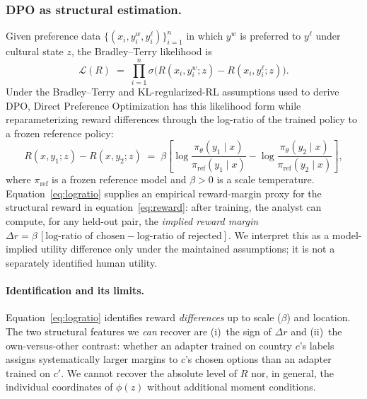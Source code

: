 \documentclass[11pt,letterpaper]{article}
\begin{document}
\subsubsection{DPO as structural estimation.}
Given preference data $\{(x_i,y_i^{w},y_i^{\ell})\}_{i=1}^{n}$ in which $y^{w}$ is preferred to $y^{\ell}$ under cultural state $z$, the Bradley--Terry likelihood is
\begin{equation}
  \mathcal{L}(R) \;=\; \prod_{i=1}^{n} \sigma\bigl(R(x_i,y_i^{w};z)-R(x_i,y_i^{\ell};z)\bigr).
  \label{eq:likelihood}
\end{equation}
Under the Bradley--Terry and KL-regularized-RL assumptions used to derive DPO, Direct Preference Optimization \cite{rafailov2023} has this likelihood form while reparameterizing reward differences through the log-ratio of the trained policy to a frozen reference policy:
\begin{equation}
  R(x,y_1;z)-R(x,y_2;z) \;=\; \beta\left[
    \log\frac{\pi_{\theta}(y_1\mid x)}{\pi_{\mathrm{ref}}(y_1\mid x)}
    -
    \log\frac{\pi_{\theta}(y_2\mid x)}{\pi_{\mathrm{ref}}(y_2\mid x)}
  \right],
  \label{eq:logratio}
\end{equation}
where $\pi_{\mathrm{ref}}$ is a frozen reference model and $\beta>0$ is a scale temperature. Equation~\eqref{eq:logratio} supplies an empirical reward-margin proxy for the structural reward in equation~\eqref{eq:reward}: after training, the analyst can compute, for any held-out pair, the \emph{implied reward margin} $\widehat{\Delta r} = \beta\,[\text{log-ratio of chosen} - \text{log-ratio of rejected}]$. We interpret this as a model-implied utility difference only under the maintained assumptions; it is not a separately identified human utility.

\paragraph{Identification and its limits.}
Equation~\eqref{eq:logratio} identifies reward \emph{differences} up to scale ($\beta$) and location. The two structural features we \emph{can} recover are (i)~the sign of $\Delta r$ and (ii)~the own-versus-other contrast: whether an adapter trained on country $c$'s labels assigns systematically larger margins to $c$'s chosen options than an adapter trained on $c'$. We cannot recover the absolute level of $R$ nor, in general, the individual coordinates of $\phi(z)$ without additional moment conditions.
\end{document}
